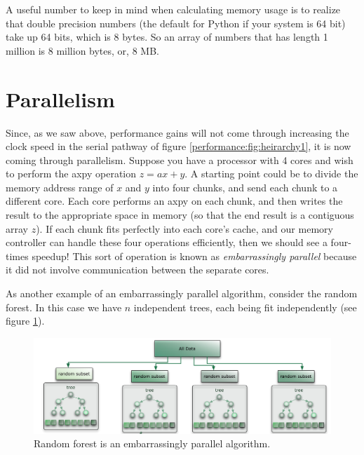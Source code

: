 A useful number to keep in mind when calculating memory usage is to realize that double precision numbers (the default for Python if your system is 64 bit) take up 64 bits, which is 8 bytes.  So an array of numbers that has length 1 million is 8 million bytes, or, 8 MB.

\section{Parallelism}

Since, as we saw above, performance gains will not come through increasing the clock speed in the serial pathway of figure \ref{performance:fig:heirarchy1}, it is now coming through parallelism.  Suppose you have a processor with 4 cores and wish to perform the axpy operation $z = ax + y$.  A starting point could be to divide the memory address range of $x$ and $y$ into four chunks, and send each chunk to a different core.  Each core performs an axpy on each chunk, and then writes the result to the appropriate space in memory (so that the end result is a contiguous array $z$).  If each chunk fits perfectly into each core's cache, and our memory controller can handle these four operations efficiently, then we should see a four-times speedup!  This sort of operation is known as \emph{embarrassingly parallel} because it did not involve communication between the separate cores.

As another example of an embarrassingly parallel algorithm, consider the random forest.  In this case we have $n$ independent trees, each being fit independently (see figure \ref{performance:fig:RF}).
\begin{figure}
  \includegraphics[width=\textwidth]{../images/RF}
  \caption{Random forest is an embarrassingly parallel algorithm.}
  \label{performance:fig:RF}
\end{figure}

